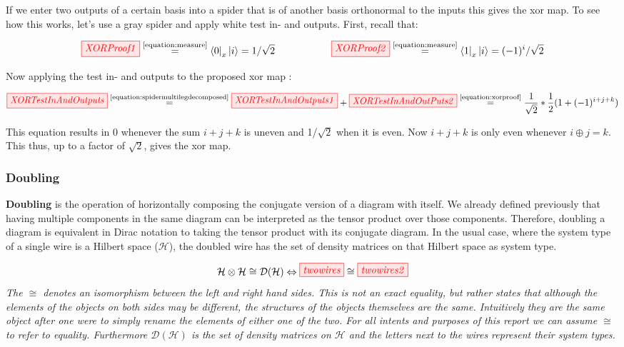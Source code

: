 \documentclass[]{article}
\newcommand{\equaltext}[1]{\ensuremath{\stackrel{\text{#1}}{=}}}
\begin{document}
If we enter two outputs of a certain basis into a spider that is of another basis orthonormal to the inputs this gives the xor map. To see how this works, let's use a gray spider and apply white test in- and outputs. First, recall that:

\begin{equation}
\label{equation:xorproof}
\tikzfig{XORProof1} \equaltext{\ref{equation:measure}} \bra{0}_x\ket{i} =  1/\sqrt{2} ~~~~~~~~~~~~~~~~~ \tikzfig{XORProof2} \equaltext{\ref{equation:measure}} \bra{1}_x\ket{i} = (-1)^i/\sqrt{2}
\end{equation}

Now applying the test in- and outputs to the proposed xor map \cite{Coecke2017}:

\begin{equation}
\label{equation:xormap}
\tikzfig{XORTestInAndOutputs} \equaltext{\ref{equation:spidermultilegdecomposed}} \tikzfig{XORTestInAndOutputs1} + \tikzfig{XORTestInAndOutPuts2} \equaltext{\ref{equation:xorproof}} \frac{1}{\sqrt{2}} * \frac{1}{2}(1+(-1)^{i+j+k})
\end{equation}

This equation results in 0 whenever the sum $i+j+k$ is uneven and 1/$\sqrt{2}$ when it is even. Now $i+j+k$ is only even whenever $i \oplus j = k$. This thus, up to a factor of $\sqrt{2}$, gives the xor map.


\subsubsection{Doubling}
\label{doubling}

\textbf{Doubling} is the operation of horizontally composing the conjugate version of a diagram with itself. We already defined previously that having multiple components in the same diagram can be interpreted as the tensor product over those components. Therefore, doubling a diagram is equivalent in Dirac notation to taking the tensor product with its conjugate diagram. In the usual case, where the system type of a single wire is a Hilbert space ($\mathcal{H}$), the doubled wire has the set of density matrices on that Hilbert space as system type.

\begin{equation}
\mathcal{H} \otimes \mathcal{H} \cong \mathcal{D}(\mathcal{H}) \Leftrightarrow \tikzfig{twowires} \cong \tikzfig{twowires2}
\end{equation}
\textit{The $\cong$ denotes an isomorphism between the left and right hand sides. This is not an exact equality, but rather states that although the elements of the objects on both sides may be different, the structures of the objects themselves are the same. Intuitively they are the same object after one were to simply rename the elements of either one of the two. For all intents and purposes of this report we can assume $\cong$ to refer to equality. Furthermore $\mathcal{D}(\mathcal{H})$ is the set of density matrices on $\mathcal{H}$ and the letters next to the wires represent their system types.}
\end{document}
